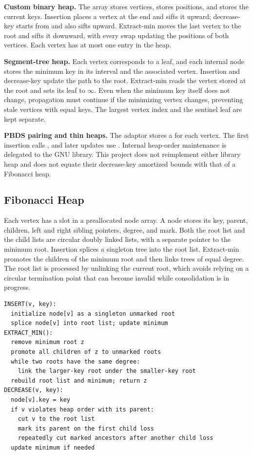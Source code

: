 \textbf{Custom binary heap.} The array  stores vertices,
 stores positions, and  stores the current keys. Insertion
places a vertex at the end and sifts it upward; decrease-key starts from
 and also sifts upward. Extract-min moves the last vertex to the root
and sifts it downward, with every swap updating the positions of both vertices.
Each vertex has at most one entry in the heap.

\textbf{Segment-tree heap.} Each vertex corresponds to a leaf, and each internal
node stores the minimum key in its interval and the associated vertex. Insertion
and decrease-key update the path to the root. Extract-min reads the vertex stored
at the root and sets its leaf to $\infty$. Even when the minimum key itself does not
change, propagation must continue if the minimizing vertex changes, preventing
stale vertices with equal keys. The largest vertex index and the sentinel leaf are
kept separate.

\textbf{PBDS pairing and thin heaps.} The adaptor stores a 
for each vertex. The first insertion calls , and later updates use
. Internal heap-order maintenance is delegated to the GNU library.
This project does not reimplement either library heap and does not equate their
decrease-key amortized bounds with that of a Fibonacci heap.

\subsection{Fibonacci Heap}
Each vertex has a slot in a preallocated node array. A node stores its key, parent,
children, left and right sibling pointers, degree, and mark. Both the root list and
the child lists are circular doubly linked lists, with a separate pointer to the
minimum root. Insertion splices a singleton tree into the root list. Extract-min
promotes the children of the minimum root and then links trees of equal degree.
The root list is processed by unlinking the current root, which avoids relying on a
circular termination point that can become invalid while consolidation is in progress.

\begin{lstlisting}[caption={Key operations of the Fibonacci heap}]
INSERT(v, key):
  initialize node[v] as a singleton unmarked root
  splice node[v] into root list; update minimum
EXTRACT_MIN():
  remove minimum root z
  promote all children of z to unmarked roots
  while two roots have the same degree:
    link the larger-key root under the smaller-key root
  rebuild root list and minimum; return z
DECREASE(v, key):
  node[v].key = key
  if v violates heap order with its parent:
    cut v to the root list
    mark its parent on the first child loss
    repeatedly cut marked ancestors after another child loss
  update minimum if needed
\end{lstlisting}

